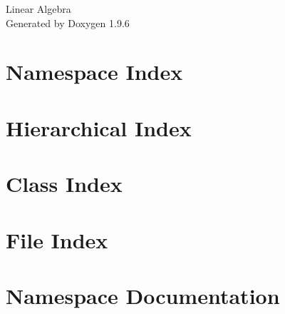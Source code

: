 \documentclass[twoside]{book}
\newcommand{\+}{\discretionary{\mbox{\scriptsize$\hookleftarrow$}}{}{}}
\newcommand{\clearemptydoublepage}{%
    \newpage{\pagestyle{empty}\cleardoublepage}%
  }
\begin{document}
  \raggedbottom
    \hypersetup{pageanchor=false,
                bookmarksnumbered=true,
                pdfencoding=unicode
               }
  \begin{titlepage}
  \vspace*{7cm}
  \begin{center}%
  {\Large Linear Algebra}\\
  \vspace*{1cm}
  {\large Generated by Doxygen 1.9.6}\\
  \end{center}
  \end{titlepage}
  \clearemptydoublepage
  \tableofcontents
  \clearemptydoublepage
  \hypersetup{pageanchor=true}
\chapter{Namespace Index}

\chapter{Hierarchical Index}

\chapter{Class Index}

\chapter{File Index}

\chapter{Namespace Documentation}







\end{document}
